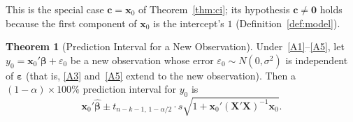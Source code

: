 \documentclass[12pt,a4paper]{article}
\makeatletter
\theoremstyle{definition}
\newtheorem{theorem}{Theorem}[section]
\renewenvironment{proof}[1][\proofname]{\par
  \pushQED{\qed}%
  \normalfont \topsep6\p@\@plus6\p@\relax
  \trivlist
  \item[\hskip\labelsep\bfseries #1\@addpunct{.}]\ignorespaces
}{%
  \popQED\endtrivlist\@endpefalse
}
\newcommand{\bX}{\mathbf{X}}
\newcommand{\bx}{\mathbf{x}}
\def\bb{\boldsymbol{\beta}}
\newcommand{\be}{\boldsymbol{\varepsilon}}
\def\bc{\mathbf{c}}
\newcommand{\bzero}{\mathbf{0}}
\makeatother
\begin{document}
\begin{proof}
This is the special case $\bc = \bx_0$ of Theorem~\ref{thm:ci}; its hypothesis $\bc \neq \bzero$ holds because the first component of $\bx_0$ is the intercept's $1$ (Definition~\ref{def:model}).
\end{proof}

\begin{theorem}[Prediction Interval for a New Observation]\label{thm:pred}
Under~\ref{A1}--\ref{A5}, let $y_0 = \bx_0'\bb + \varepsilon_0$ be a new observation whose error $\varepsilon_0 \sim N(0, \sigma^2)$ is independent of $\be$ (that is, \ref{A3} and~\ref{A5} extend to the new observation). Then a $(1-\alpha) \times 100\%$ prediction interval for $y_0$ is
\begin{equation}
\bx_0'\hat{\bb} \pm t_{n-k-1,\,1-\alpha/2} \cdot s\sqrt{1 + \bx_0'(\bX'\bX)^{-1}\bx_0}.
\end{equation}
\end{theorem}
\end{document}
